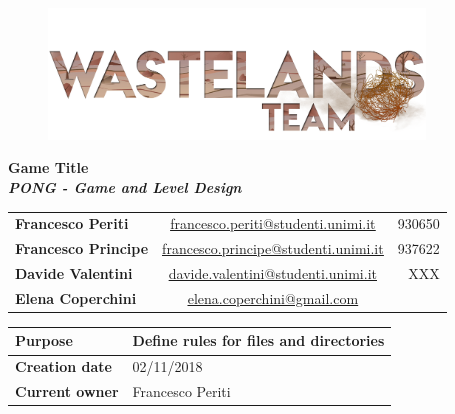 \documentclass[12pt]{article}
\begin{document}
\begin{center}
  \begin{figure}[H]
  \centering
  \vspace*{5\baselineskip}
  \includegraphics[width=10cm]{Documents/Images/Logos/logoTeam}
  \end{figure}

  \vspace{50pt}
  {\huge \textbf{Game Title}} \\
  {\large \textbf{ \textit{PONG - Game and Level Design}}}
\end{center}

\vspace{20pt}
\begin{table}[H]
  \centering
  \begin{tabular}{lcr}
    \textbf{Francesco Periti}	& \underline{\href{mailto:francesco.periti@studenti.unimi.it}{francesco.periti@studenti.unimi.it}}	& 930650 \\
    \textbf{Francesco Principe}	& \underline{\href{mailto:francesco.principe@studenti.unimi.it}{francesco.principe@studenti.unimi.it}}	& 937622 \\
    \textbf{Davide Valentini}	& \underline{\href{mailto:davide.valentini@studenti.unimi.it}{davide.valentini@studenti.unimi.it}}	& XXX \\
    \textbf{Elena Coperchini}	& \underline{\href{mailto:elena.coperchini@gmail.com}{elena.coperchini@gmail.com}}			& \\
  \end{tabular}
\end{table}


  \vspace{10pt}
\begin{table}[H]
  \centering
  \begin{tabular}{|l|l|}
    \hline
    \cellcolor{lightgray}\textbf{Purpose} &  Define rules for files and directories \\\hline
    \cellcolor{lightgray}\textbf{Creation date} & 02/11/2018 \\\hline
    \cellcolor{lightgray}\textbf{Current owner} & Francesco Periti \\\hline
  \end{tabular}
\end{table}
\end{document}
